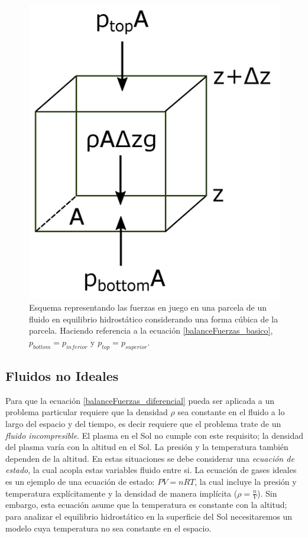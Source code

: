 \begin{figure}[!ht]
	\centering
	\includegraphics[scale=0.4]{Figuras/L2_hydrostatic_copy.png}
	\caption{Esquema representando las fuerzas en juego en una parcela de un
	fluido en equilibrio hidrostático considerando una forma cúbica de la
	parcela. Haciendo referencia a la ecuación \ref*{balanceFuerzas_basico},
	\(p_{bottom} = p_{inferior}\) y \(p_{top} = p_{superior}\).
	\cite{eqhsPennStateWebsite}}
	\label{balanceFuerzas_imgCubo}
\end{figure}

\subsection*{Fluidos no Ideales}
Para que la ecuación \ref{balanceFuerzas_diferencial} pueda ser aplicada a un
problema particular requiere que la densidad \(\rho\) sea constante en el fluido
a lo largo del espacio y del tiempo, es decir requiere que el problema trate de
un \textit{fluido incompresible}. El plasma en el Sol no cumple con este
requisito; la densidad del plasma varía con la altitud en el Sol. La presión y
la temperatura también dependen de la altitud. En estas situaciones se debe
considerar una \textit{ecuación de estado}, la cual acopla estas variables
fluido entre si. La ecuación de gases ideales es un ejemplo de una ecuación de
estado: \(PV = nRT\), la cual incluye la presión y temperatura explícitamente y
la densidad de manera implícita (\(\rho = \frac{n}{V}\)). Sin embargo, esta
ecuación asume que la temperatura es constante con la altitud; para analizar el
equilibrio hidrostático en la superficie del Sol necesitaremos un modelo cuya
temperatura no sea constante en el espacio.

